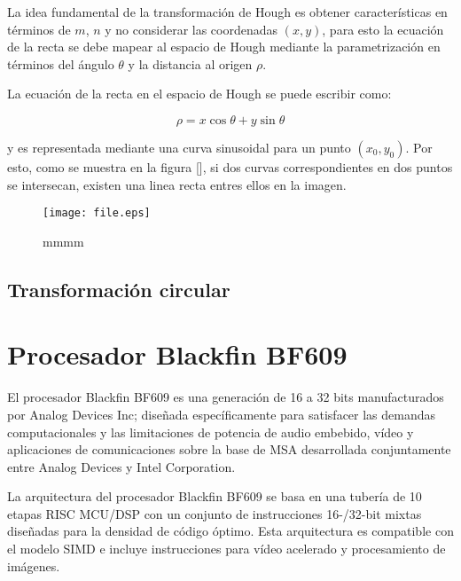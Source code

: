 La idea fundamental de la transformación de Hough es obtener características en términos de $m$, $n$ y no considerar las
coordenadas $(x,y)$, para esto la ecuación de la recta se debe mapear al espacio de Hough mediante la parametrización en
términos del ángulo $\theta$ y la distancia al origen $\rho$.%




%


La ecuación de la recta en el espacio de Hough se puede escribir como:

\begin{equation}
\rho = x\cos\theta + y\sin\theta
\end{equation}

y es representada mediante una curva sinusoidal para un punto $(x_{0},y_{0})$. Por esto, como se muestra en la figura [],
si dos curvas correspondientes en dos puntos se intersecan, existen una linea recta entres ellos en la imagen.

\begin{figure}[hbtp]
\texttt{[image: file.eps]}
\caption{mmmm}
\end{figure}

  
\subsection{Transformación circular}



\section{Procesador Blackfin BF609}

El procesador Blackfin BF609 es una generación de 16 a 32 bits manufacturados por Analog Devices Inc; diseñada
específicamente para satisfacer las demandas computacionales y las limitaciones de potencia de audio embebido, vídeo y
aplicaciones de comunicaciones sobre la base de MSA desarrollada conjuntamente entre Analog Devices y Intel
Corporation\cite{GanKuo2007}. 

La arquitectura del procesador Blackfin BF609 se basa en una tubería de 10 etapas RISC MCU/DSP con un conjunto de
instrucciones 16-/32-bit mixtas diseñadas para la densidad de código óptimo. Esta arquitectura es compatible con el
modelo SIMD\cite{Lawson1992} e incluye instrucciones para vídeo acelerado y procesamiento de imágenes.  

